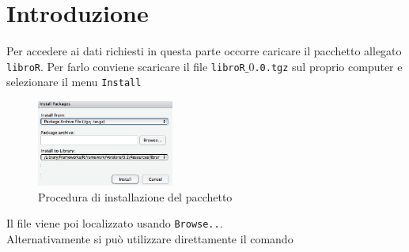 \documentclass[onecolumn,12pt]{book}\usepackage[]{graphicx}\usepackage[]{color}
\author{Federico Comoglio e  Maurizio Rinaldi}
\begin{document}



\markright{\today}
\thispagestyle{empty}
\maketitle
\newpage
\thispagestyle{empty}
\tableofcontents
\newpage
\thispagestyle{empty}
 \mainmatter

\chapter{Introduzione}
Per accedere ai dati richiesti in questa parte occorre caricare il pacchetto allegato \texttt{libroR}. Per farlo conviene scaricare il file \texttt{libroR$\_0$.0.tgz}  sul proprio computer e  selezionare il menu \texttt{Install}
\begin{center}\begin{figure}[H]
\includegraphics[width=0.4\textwidth]{../grafici/installlibro.png}
\caption{Procedura di installazione del pacchetto}
\label{fig::rlibroinstall} \end{figure}
\end{center}
Il file viene poi localizzato usando \texttt{Browse..}. \\
Alternativamente si pu\`o utilizzare direttamente il comando
\end{document}
